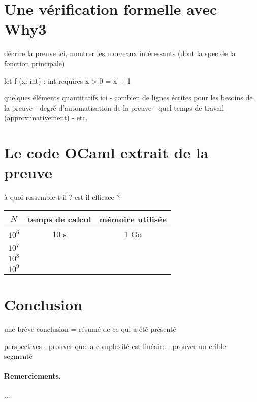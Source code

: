 \documentclass[a4paper]{easychair}
\begin{document}
\section{Une vérification formelle avec Why3}

décrire la preuve ici, montrer les morceaux intéressants
(dont la spec de la fonction principale)

\begin{why3}
  let f (x: int) : int
    requires { x > 0 }
  =
    x + 1
\end{why3}

quelques éléments quantitatifs ici
- combien de lignes écrites pour les besoins de la preuve
- degré d'automatisation de la preuve
- quel temps de travail (approximativement)
- etc.

\section{Le code OCaml extrait de la preuve}

à quoi ressemble-t-il ?
est-il efficace ?

\begin{center}
  \begin{tabular}{|c|c|c|}
    \hline
    $N$ & temps de calcul & mémoire utilisée \\
    \hline\hline
    $10^6$ & 10 s & 1 Go \\\hline
    $10^7$ & \\\hline
    $10^8$ & \\\hline
    $10^9$ & \\\hline
  \end{tabular}
\end{center}

\section{Conclusion}
\label{sec:conclusion}

une brève conclusion = résumé de ce qui a été présenté

perspectives
- prouver que la complexité est linéaire
- prouver un crible segmenté~\cite{crible-segmente}


\paragraph{Remerciements.} ...



\end{document}
